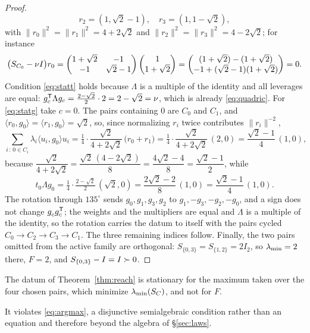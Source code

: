 \begin{proof}
\[  r_2=(1,\sqrt2-1),\quad r_3=(1,1-\sqrt2),
\]
with $\lVert r_0\rVert^2=\lVert r_1\rVert^2=4+2\sqrt2$ and
$\lVert r_2\rVert^2=\lVert r_3\rVert^2=4-2\sqrt2$; for instance
\[
  \bigl(S_{C_0}-\nu I\bigr)r_0
  =\begin{pmatrix}1+\sqrt2&-1\\-1&\sqrt2-1\end{pmatrix}
   \begin{pmatrix}1\\1+\sqrt2\end{pmatrix}
  =\begin{pmatrix}(1+\sqrt2)-(1+\sqrt2)\\
                  -1+(\sqrt2-1)(1+\sqrt2)\end{pmatrix}=0 .
\]
Condition \eqref{eq:statt} holds because $\Lambda$ is a multiple of the
identity and all leverages are equal:
$g_c^{\mathsf{T}}\Lambda g_c=\tfrac{2-\sqrt2}{2}\cdot2=2-\sqrt2=\nu$, which is
already \eqref{eq:quadric}.  For \eqref{eq:statg} take $c=0$.  The pairs
containing $0$ are $C_0$ and $C_1$, and
$\langle r_0,g_0\rangle=\langle r_1,g_0\rangle=\sqrt2$, so, since
normalizing $r_i$ twice contributes $\lVert r_i\rVert^{-2}$,
\[
  \sum_{i\,:\,0\in C_i}\lambda_i\langle u_i,g_0\rangle u_i
  =\tfrac14\cdot\frac{\sqrt2}{4+2\sqrt2}\,\bigl(r_0+r_1\bigr)
  =\tfrac14\cdot\frac{\sqrt2}{4+2\sqrt2}\,(2,0)
  =\frac{\sqrt2-1}{4}\,(1,0),
\]
because
$\dfrac{\sqrt2}{4+2\sqrt2}=\dfrac{\sqrt2\,(4-2\sqrt2)}{8}
=\dfrac{4\sqrt2-4}{8}=\dfrac{\sqrt2-1}{2}$, while
\[
  t_0\Lambda g_0=\tfrac14\cdot\tfrac{2-\sqrt2}{2}\,(\sqrt2,0)
  =\frac{2\sqrt2-2}{8}\,(1,0)=\frac{\sqrt2-1}{4}\,(1,0).
\]
The rotation through $135^{\circ}$ sends $g_0,g_1,g_3,g_2$ to
$g_1,-g_3,-g_2,-g_0$, and a sign does not change
$g_c^{\vphantom{\mathsf{T}}}g_c\tp$; the weights and the multipliers are
equal and $\Lambda$ is a multiple of the identity, so the rotation
carries the datum to itself with the pairs cycled
$C_0\to C_2\to C_3\to C_1$.  The three remaining indices follow.  Finally,
the two pairs omitted from the active family are orthogonal:
$S_{\{0,3\}}=S_{\{1,2\}}=2I_2$, so $\lambda_{\min}=2$ there, $F=2$, and
$S_{\{0,3\}}-I=I\succ0$.
\end{proof}

The datum of Theorem~\ref{thm:reach} is stationary for the maximum taken
over the four chosen pairs, which minimize $\lambda_{\min}(S_{C})$, and not for $F$.

It violates \eqref{eq:argmax}, a disjunctive semialgebraic condition
rather than an equation and therefore beyond the algebra of
\S\ref{sec:laws}.

